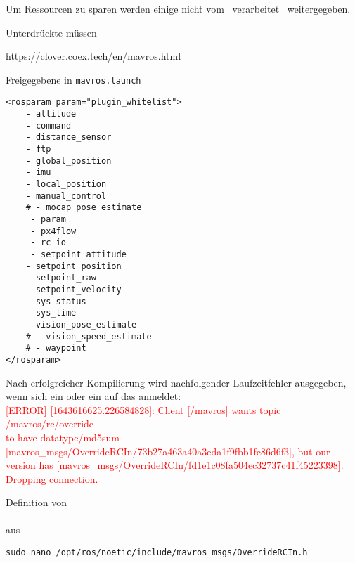 




Um Ressourcen zu sparen werden einige \Topic[s] nicht vom \Pie\ verarbeitet \bzw\ weitergegeben.

Unterdrückte \Topic[s] müssen 
\missing[ungetested!]

https://clover.coex.tech/en/mavros.html

Freigegebene \Topic[s] in \texttt{mavros.launch}

\begin{lstlisting}[style=Style_XML, numbers=none, caption={[Freigegebene Topics] Freigegebene \Topic[s] in \texttt{mavros.launch}}]
<rosparam param="plugin_whitelist">
	- altitude
	- command
	- distance_sensor
	- ftp
	- global_position
	- imu
	- local_position
	- manual_control
	# - mocap_pose_estimate
	 - param
	 - px4flow
	 - rc_io
	 - setpoint_attitude
	- setpoint_position
	- setpoint_raw
	- setpoint_velocity
	- sys_status
	- sys_time
	- vision_pose_estimate
	# - vision_speed_estimate
	# - waypoint
</rosparam>
\end{lstlisting}


Nach erfolgreicher Kompilierung wird nachfolgender Laufzeitfehler ausgegeben, wenn sich ein  oder ein  auf das  anmeldet:\\
\textcolor{red}{[ERROR] [1643616625.226584828]: Client [/mavros] wants topic /mavros/rc/override \\to have datatype/md5sum [mavros\_msgs/OverrideRCIn/73b27a463a40a3eda1f9fbb1fc86d6f3], but our version has [mavros\_msgs/OverrideRCIn/fd1e1c08fa504ec32737c41f45223398]. Dropping connection.}

Definition von \\ \\aus 

\begin{lstlisting}[style=Style_Bash, caption=Befehl zum Öffnen des \textit{OverrideRCIn}-Headers]
sudo nano /opt/ros/noetic/include/mavros_msgs/OverrideRCIn.h
\end{lstlisting}

